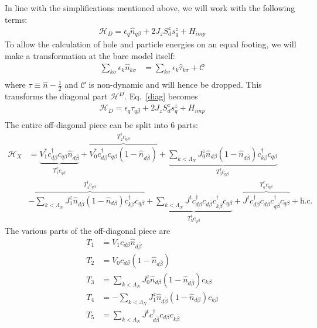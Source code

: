 \documentclass[twoside,11pt]{report}
\numberwithin{equation}{section}
\begin{document}
In line with the simplifications mentioned above, we will work with the following terms:
\begin{equation}\begin{aligned}
	\label{diag}
\mathcal{H}_D = \epsilon_q \hat n_{q\beta} + 2J_z S^z_d s^z_q + H_{imp}
\end{aligned}\end{equation}
 To allow the calculation of hole and particle energies on an equal footing, we will make a transformation at the bare model itself:
 \begin{equation}\begin{aligned}
\sum_{k\sigma} \epsilon_k \hat n_{k\sigma} &= \sum_{k\sigma} \epsilon_k \hat \tau_{k\sigma} + \mathcal{C}\\
\end{aligned}\end{equation}
where \(\tau \equiv \hat n - \frac{1}{2}\) and \(\mathcal{C}\) is non-dynamic and will hence be dropped. This transforms the diagonal part \(\mathcal{H}^D\). Eq.~\ref{diag} becomes
\begin{equation}\begin{aligned}
\mathcal{H}_D = \epsilon_q \tau_{q\beta} + 2J_z S^z_d s^z_q  + H_{imp}\\
\end{aligned}\end{equation}
The entire off-diagonal piece can be split into 6 parts:
\begin{equation}\begin{aligned}
	\mathcal{H}_X &= \underbrace{V_1^* c^\dagger_{d\beta}c_{q\beta}\hat n_{d\overline\beta}}_{T^\dagger_1 c_{q\beta}} + \overbrace{V_0^* c^\dagger_{d\beta}c_{q\beta}\left(1 - \hat n_{d\overline\beta}\right)}^{T^\dagger_2 c_{q\beta}} + \underbrace{\sum_{k<\Lambda_N}J^z_0 \hat n_{d\beta}\left(1 - \hat n_{d\overline\beta}\right) c^\dagger_{k\beta}c_{q\beta}}_{T^\dagger_3 c_{q\beta}} \\
	       &- \overbrace{\sum_{k<\Lambda_N}J^z_1 \hat n_{d\overline\beta}\left(1 - \hat n_{d\beta}\right) c^\dagger_{k\beta}c_{q\beta}}^{T^\dagger_4 c_{q\beta}} + \underbrace{\sum_{k<\Lambda_N}J^t c^\dagger_{d\beta}c_{d\overline\beta}c^\dagger_{k\overline\beta}c_{q \beta}}_{T^\dagger_5 c_{q\beta}} + \overbrace{J^t c^\dagger_{d\beta}c_{d\overline\beta}c^\dagger_{q\overline\beta}c_{q \beta}}^{T^\dagger_6 c_{q\beta}} + \text{h.c.}
\end{aligned}\end{equation}
The various parts of the off-diagonal piece are
\begin{equation}\begin{aligned}
	T_1 &= V_1 c_{d\beta}\hat n_{d\overline\beta}\\
	T_2 &= V_0 c_{d\beta}\left(1 - \hat n_{d\overline\beta}\right)\\
	T_3 &= \sum_{k<\Lambda_N}J^z_0 \hat n_{d\beta}\left(1 - \hat n_{d\overline\beta}\right) c_{k\beta}\\
	T_4 &= -\sum_{k<\Lambda_N}J^z_1 \hat n_{d\overline\beta}\left(1 - \hat n_{d\beta}\right) c_{k\beta}\\
	T_5 &= \sum_{k<\Lambda_N}J^t c^\dagger_{d\overline\beta}c_{d\beta}c_{k\overline\beta}
\end{aligned}\end{equation}
\end{document}
